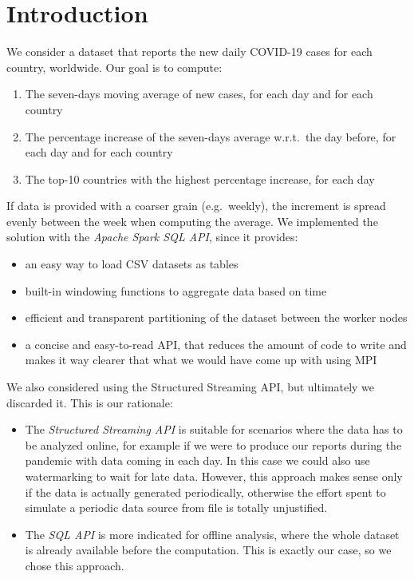 \section{Introduction}
\label{sec:intro}

We consider a dataset that reports the new daily COVID-19 cases for each country, worldwide.
Our goal is to compute:
\begin{enumerate}
    \item The seven-days moving average of new cases, for each day and for each country
    \item The percentage increase of the seven-days average w.r.t.\ the day before, for each day and for each country
    \item The top-10 countries with the highest percentage increase, for each day
\end{enumerate}

\noindent
If data is provided with a coarser grain (e.g.\ weekly), the increment is spread evenly between the week when computing the average.
We implemented the solution with the \emph{Apache Spark SQL API}, since it provides:
\begin{itemize}
    \item an easy way to load CSV datasets as tables
    \item built-in windowing functions to aggregate data based on time
    \item efficient and transparent partitioning of the dataset between the worker nodes
    \item a concise and easy-to-read API, that reduces the amount of code to write and makes it way clearer that what we would have come up with using MPI
\end{itemize}

\noindent
We also considered using the Structured Streaming API, but ultimately we discarded it. This is our rationale:
\begin{itemize}
    \item The \emph{Structured Streaming API} is suitable for scenarios where the data has to be analyzed online, for example if we were to produce our reports during the pandemic with data coming in each day. In this case we could also use watermarking to wait for late data. However, this approach makes sense only if the data is actually generated periodically, otherwise the effort spent to simulate a periodic data source from file is totally unjustified.
    \item The \emph{SQL API} is more indicated for offline analysis, where the whole dataset is already available before the computation. This is exactly our case, so we chose this approach.
\end{itemize}